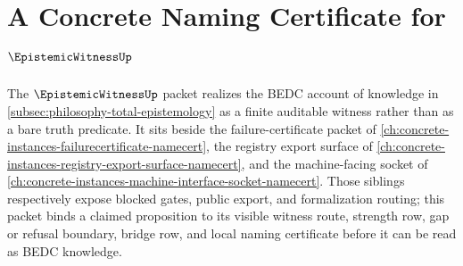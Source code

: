 \chapter{A Concrete Naming Certificate for $\EpistemicWitnessUp$}
\label{ch:concrete-instances-epistemicwitness-namecert}

The $\EpistemicWitnessUp$ packet realizes the BEDC account of knowledge in \autoref{subsec:philosophy-total-epistemology} as a finite auditable witness rather than as a bare truth predicate. It sits beside the failure-certificate packet of \autoref{ch:concrete-instances-failurecertificate-namecert}, the registry export surface of \autoref{ch:concrete-instances-registry-export-surface-namecert}, and the machine-facing socket of \autoref{ch:concrete-instances-machine-interface-socket-namecert}. Those siblings respectively expose blocked gates, public export, and formalization routing; this packet binds a claimed proposition to its visible witness route, strength row, gap or refusal boundary, bridge row, and local naming certificate before it can be read as BEDC knowledge.

